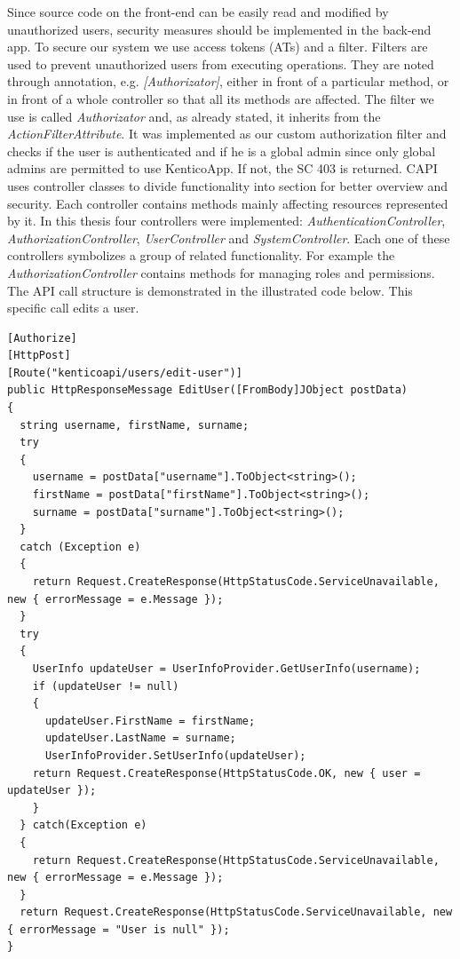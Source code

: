 Since source code on the front-end can be easily read and modified by unauthorized users, security measures should be implemented in the back-end app. To secure our system we use access tokens (ATs) and a filter. Filters are used to prevent unauthorized users from executing operations. They are noted through annotation, e.g. \textit{[Authorizator]}, either in front of a particular method, or in front of a whole controller so that all its methods are affected. The filter we use is called \textit{Authorizator} and, as already stated, it inherits from the \textit{ActionFilterAttribute}. It was implemented as our custom authorization filter and checks if the user is authenticated and if he is a global admin since only global admins are permitted to use KenticoApp. If not, the SC 403 is returned.
CAPI uses controller classes to divide functionality into section for better overview and security. Each controller contains methods mainly affecting resources represented by it. In this thesis four controllers were implemented: \textit{AuthenticationController}, \textit{AuthorizationController}, \textit{UserController} and \textit{SystemController}. Each one of these controllers symbolizes a group of related functionality. For example the \textit{AuthorizationController} contains methods for managing roles and permissions. 
The API call structure is demonstrated in the illustrated code below. This specific call edits a user.
\lstset{style=sharpc, numbers=left}
\begin{lstlisting}
[Authorize]
[HttpPost]
[Route("kenticoapi/users/edit-user")]
public HttpResponseMessage EditUser([FromBody]JObject postData)
{
  string username, firstName, surname;
  try
  {
    username = postData["username"].ToObject<string>();
    firstName = postData["firstName"].ToObject<string>(); 
    surname = postData["surname"].ToObject<string>();
  }
  catch (Exception e)
  {
    return Request.CreateResponse(HttpStatusCode.ServiceUnavailable, new { errorMessage = e.Message });
  }
  try
  {
    UserInfo updateUser = UserInfoProvider.GetUserInfo(username);
    if (updateUser != null)
    {
      updateUser.FirstName = firstName;
      updateUser.LastName = surname;
      UserInfoProvider.SetUserInfo(updateUser);
    return Request.CreateResponse(HttpStatusCode.OK, new { user = updateUser });
    }
  } catch(Exception e)
  {
    return Request.CreateResponse(HttpStatusCode.ServiceUnavailable, new { errorMessage = e.Message });
  }
  return Request.CreateResponse(HttpStatusCode.ServiceUnavailable, new { errorMessage = "User is null" });
}
\end{lstlisting}
